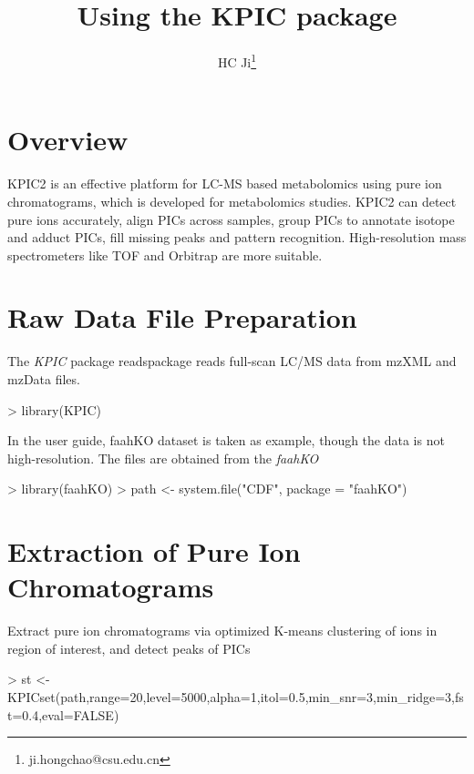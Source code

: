 \documentclass[a4paper]{article}
\author{HC Ji\footnote{ji.hongchao@csu.edu.cn}}
\newcommand{\Rpackage}[1]{{\textit{#1}}}
\begin{document}

\title{Using the KPIC package}
\maketitle

\section{Overview} 
KPIC2 is an effective platform for LC-MS based metabolomics using pure ion chromatograms, which is developed for metabolomics studies. KPIC2 can detect pure ions accurately, align PICs across samples, group PICs to annotate isotope and adduct PICs, fill missing peaks and pattern recognition. High-resolution mass spectrometers like TOF and Orbitrap are more suitable.

\section{Raw Data File Preparation}
The \Rpackage{KPIC} package readspackage reads full-scan LC/MS data from mzXML and mzData files.
\begin{Schunk}
\begin{Sinput}
> library(KPIC)
\end{Sinput}
\end{Schunk}
In the user guide, faahKO dataset is taken as example, though the data is not high-resolution. The files are obtained from the \Rpackage{faahKO}
\begin{Schunk}
\begin{Sinput}
> library(faahKO)
> path <- system.file("CDF", package = "faahKO")
\end{Sinput}
\end{Schunk}

\section{Extraction of Pure Ion Chromatograms}
Extract pure ion chromatograms via optimized K-means clustering of ions in region of interest, and detect peaks of PICs
\begin{Schunk}
\begin{Sinput}
> st <- KPICset(path,range=20,level=5000,alpha=1,itol=0.5,min_snr=3,min_ridge=3,fst=0.4,eval=FALSE) 
\end{Sinput}
\end{Schunk}
\end{document}

